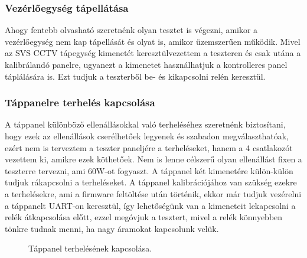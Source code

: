 \documentclass[a4paper, 12pt]{article}
\newcommand{\tab}{\hspace*{1em}}
\begin{document}
\subsubsection{Vezérlőegység tápellátása}
\tab Ahogy fentebb olvasható szeretnénk olyan tesztet is végezni, amikor a vezérlőegység nem kap tápellását és olyat is, amikor üzemszerűen működik. Mivel az SVS CCTV tápegység kimenetét keresztülvezettem a teszteren és csak utána a kalibrálandó panelre, ugyanezt a kimenetet használhatjuk a kontrolleres panel táplálására is. Ezt tudjuk a teszterből be- és kikapcsolni relén keresztül.

\subsubsection{Táppanelre terhelés kapcsolása}
A táppanel különböző ellenállásokkal való terheléséhez szeretnénk biztosítani, hogy ezek az ellenállások cserélhetőek legyenek és szabadon megválaszthatóak, ezért nem is terveztem a teszter paneljére a terheléseket, hanem a 4 csatlakozót vezettem ki, amikre ezek köthetőek. Nem is lenne célszerű olyan ellenállást fixen a teszterre tervezni, ami 60W-ot fogyaszt. A táppanel két kimenetére külön-külön tudjuk rákapcsolni a terheléseket. A táppanel kalibrációjához van szükség ezekre a terhelésekre, ami a firmware feltöltése után történik, ekkor már tudjuk vezérelni a táppanelt UART-on keresztül, így lehetőségünk van a kimeneteit lekapcsolni a relék átkapcsolása előtt, ezzel megóvjuk a tesztert, mivel a relék könnyebben tönkre tudnak menni, ha nagy áramokat kapcsolunk velük.
\begin{figure}[H]
    \centering
    \caption{Táppanel terhelésének kapcsolása.}
\end{figure}
\end{document}
